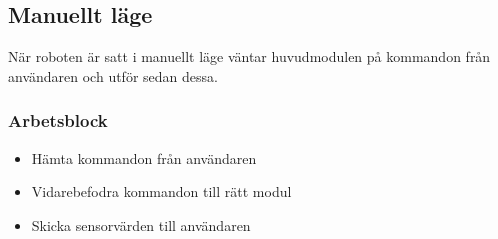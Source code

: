 \subsection{Manuellt läge}
När roboten är satt i manuellt läge väntar huvudmodulen på kommandon från användaren och utför sedan dessa.
\subsubsection{Arbetsblock}
\begin{itemize}
\item Hämta kommandon från användaren
\item Vidarebefodra kommandon till rätt modul
\item Skicka sensorvärden till användaren
\end{itemize}

